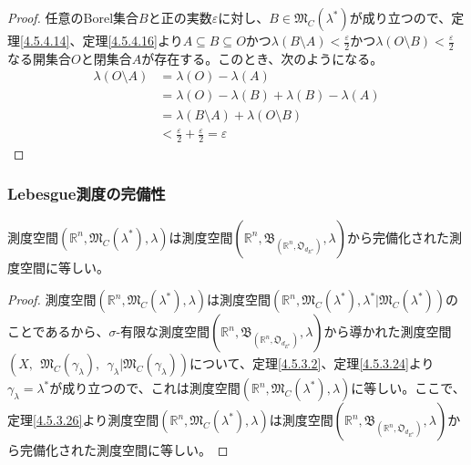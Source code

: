 \documentclass[dvipdfmx]{jsarticle}
\begin{document}
\begin{proof}
任意のBorel集合$B$と正の実数$\varepsilon$に対し、$B \in \mathfrak{M}_{C}\left( \lambda^{*} \right)$が成り立つので、定理\ref{4.5.4.14}、定理\ref{4.5.4.16}より$A \subseteq B \subseteq O$かつ$\lambda(B \setminus A) < \frac{\varepsilon}{2}$かつ$\lambda(O \setminus B) < \frac{\varepsilon}{2}$なる開集合$O$と閉集合$A$が存在する。このとき、次のようになる。
\begin{align*}
\lambda(O \setminus A) &= \lambda(O) - \lambda(A)\\
&= \lambda(O) - \lambda(B) + \lambda(B) - \lambda(A)\\
&= \lambda(B \setminus A) + \lambda(O \setminus B)\\
&< \frac{\varepsilon}{2} + \frac{\varepsilon}{2} = \varepsilon
\end{align*}
\end{proof}
\subsubsection{Lebesgue測度の完備性}%
\begin{thm}\label{4.5.4.19}
測度空間$\left( \mathbb{R}^{n},\mathfrak{M}_{C}\left( \lambda^{*} \right),\lambda \right)$は測度空間$\left( \mathbb{R}^{n},\mathfrak{B}_{\left( \mathbb{R}^{n},\mathfrak{O}_{d_{E^{n}}} \right)},\lambda \right)$から完備化された測度空間に等しい。
\end{thm}
\begin{proof}
測度空間$\left( \mathbb{R}^{n},\mathfrak{M}_{C}\left( \lambda^{*} \right),\lambda \right)$は測度空間$\left( \mathbb{R}^{n},\mathfrak{M}_{C}\left( \lambda^{*} \right),\lambda^{*}|\mathfrak{M}_{C}\left( \lambda^{*} \right) \right)$のことであるから、$\sigma$-有限な測度空間$\left( \mathbb{R}^{n},\mathfrak{B}_{\left( \mathbb{R}^{n},\mathfrak{O}_{d_{E^{n}}} \right)},\lambda \right)$から導かれた測度空間$\left( X,\ \ \mathfrak{M}_{C}\left( \gamma_{\lambda} \right),\ \ \gamma_{\lambda}|\mathfrak{M}_{C}\left( \gamma_{\lambda} \right) \right)$について、定理\ref{4.5.3.2}、定理\ref{4.5.3.24}より$\gamma_{\lambda} = \lambda^{*}$が成り立つので、これは測度空間$\left( \mathbb{R}^{n},\mathfrak{M}_{C}\left( \lambda^{*} \right),\lambda \right)$に等しい。ここで、定理\ref{4.5.3.26}より測度空間$\left( \mathbb{R}^{n},\mathfrak{M}_{C}\left( \lambda^{*} \right),\lambda \right)$は測度空間$\left( \mathbb{R}^{n},\mathfrak{B}_{\left( \mathbb{R}^{n},\mathfrak{O}_{d_{E^{n}}} \right)},\lambda \right)$から完備化された測度空間に等しい。
\end{proof}
\end{document}
